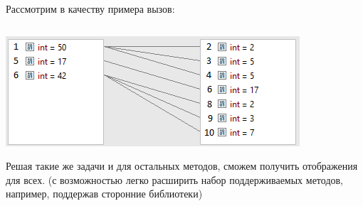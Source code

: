 \begin{frame}
\frametitle{\insertsection} 
\framesubtitle{\insertsubsection}
Рассмотрим в качеству примера вызов:
\inputminted{java}{code/FlatMapFactorizeExample.java}
\includegraphics[scale=0.8]{img/flatMapExample.png}

Решая такие же задачи и для остальных методов, сможем получить отображения для всех. (с возможностью легко расширить набор поддерживаемых методов, например, поддержав сторонние библиотеки)
\end{frame}
